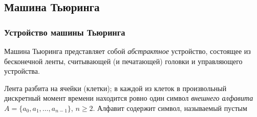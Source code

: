 \subsection{Машина Тьюринга}
\subsubsection{Устройство машины Тьюринга}
Машина Тьюринга представляет собой \textit{абстрактное} устройство, состоящее из бесконечной ленты, считывающей (и печатающей) головки и управляющего устройства.

Лента разбита на ячейки (клетки); в каждой из клеток в произвольный дискретный момент времени находится ровно один символ \textit{внешнего алфавита} $A = \{a_0, a_1, \dots, a_{n - 1}\}$, $n \geqslant 2$. Алфавит содержит символ, называемый пустым